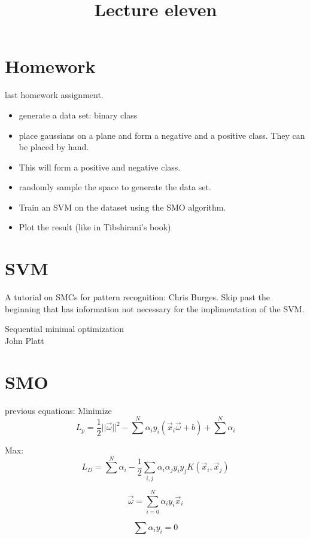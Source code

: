 \documentclass[letterpaper, 9pt]{article}
\title{Lecture eleven}
\begin{document}
\maketitle
\section{Homework}
last homework assignment.
\begin{itemize}
\item generate a data set: binary class
\item place gaussians on a plane and form a negative and a positive class. They can be placed by hand.
\item This will form a positive and negative class.
\item randomly sample the space to generate the data set.
\item Train an SVM on the dataset using the SMO algorithm.
\item Plot the result (like in Tibshirani's book)
\end{itemize}
\section{SVM}
A tutorial on SMCs for pattern recognition: Chris Burges. Skip past the beginning that has information not necessary for the implimentation of the SVM.

Sequential minimal optimization \\
John Platt

\section{SMO}

previous equations:
Minimize
\begin{equation}
L_p = \frac{1}{2} ||\vec{\omega}||^2 - \sum^N \alpha_i y_i(\vec{x}_i \vec{\omega} + b) + \sum^N \alpha_i
\end{equation}

Max:
\begin{equation}
L_D = \sum^N \alpha_i - \frac{1}{2} \sum_{i,j} \alpha_i \alpha_j y_i y_j K(\vec{x}_i,\vec{x}_j)
\end{equation}

\begin{equation}
\vec{\omega} = \sum^N_{i=0} \alpha_i y_i \vec{x}_i
\end{equation}

\begin{equation}
\sum \alpha_i y_i = 0
\end{equation}
\end{document}
